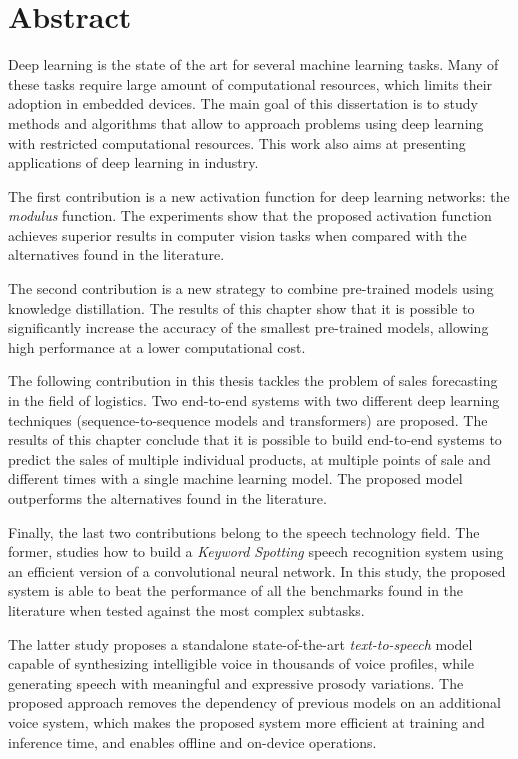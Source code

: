 
\chapter*{Abstract}


Deep learning is the state of the art for several machine learning tasks. Many of these tasks require large amount of computational resources, which limits their adoption in embedded devices. The main goal of this dissertation is to study methods and algorithms that allow to approach problems using deep learning with restricted computational resources. This work also aims at presenting applications of deep learning in industry.

The first contribution is a new activation function for deep learning networks: the \textit{modulus} function. The experiments show that the proposed activation function achieves superior results in computer vision tasks when compared with the alternatives found in the literature.

The second contribution is a new strategy to combine pre-trained models using knowledge distillation. The results of this chapter show that it is possible to significantly increase the accuracy of the smallest pre-trained models, allowing high performance at a lower computational cost.

The following contribution in this thesis tackles the problem of sales forecasting in the field of logistics. Two end-to-end systems with two different deep learning techniques (sequence-to-sequence models and transformers) are proposed. The results of this chapter conclude that it is possible to build end-to-end systems to predict the sales of multiple individual products, at multiple points of sale and different times with a single machine learning model. The proposed model outperforms the alternatives found in the literature.

Finally, the last two contributions belong to the speech technology field. The former, studies how to build a \textit{Keyword Spotting} speech recognition system using an efficient version of a convolutional neural network. In this study, the proposed system is able to beat the performance of all the benchmarks found in the literature when tested against the most complex subtasks. 

The latter study proposes a standalone state-of-the-art \textit{text-to-speech} model capable of synthesizing intelligible voice in thousands of voice profiles, while generating speech with meaningful and expressive prosody variations. The proposed approach removes the dependency of previous models on an additional voice system, which makes the proposed system more efficient at training and inference time, and enables offline and on-device operations. 





\clearpage
